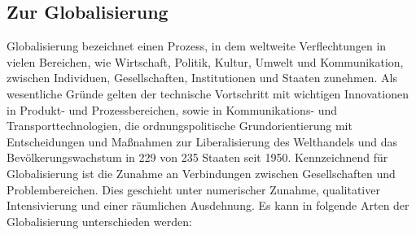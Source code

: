 \documentclass[12pt]{article}
\begin{document}
\subsection{Zur Globalisierung}
Globalisierung bezeichnet einen Prozess, in dem weltweite Verflechtungen in vielen Bereichen, wie Wirtschaft, Politik, Kultur, Umwelt und Kommunikation, zwischen Individuen, Gesellschaften, Institutionen und Staaten zunehmen. Als wesentliche Gründe gelten der technische Vortschritt mit wichtigen Innovationen in Produkt- und Prozessbereichen, sowie in Kommunikations- und Transporttechnologien, die ordnungspolitische Grundorientierung mit Entscheidungen und Maßnahmen zur Liberalisierung des Welthandels und das Bevölkerungswachstum in 229 von 235 Staaten seit 1950. Kennzeichnend für Globalisierung ist die Zunahme an Verbindungen zwischen Gesellschaften und Problembereichen. Dies geschieht unter numerischer Zunahme, qualitativer Intensivierung und einer räumlichen Ausdehnung. Es kann in folgende Arten der Globalisierung unterschieden werden:
\end{document}
